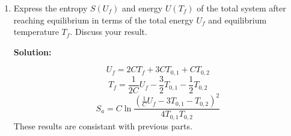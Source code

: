 \documentclass[10pt]{article}
\newenvironment{Solution}
    {\textbf{Solution:}
    
    \vspace{5mm}
    \begin{tcolorbox}
    }
    {
    \end{tcolorbox}
    \vspace{5mm}
    }
\begin{document}
\begin{enumerate}
\begin{enumerate}
\item Express the entropy $S\left(U_{f}\right)$ and energy $U\left(T_{f}\right)$ of the total system after reaching equilibrium in terms of the total energy $U_{f}$ and equilibrium temperature $T_{f} .$ Discuss your result.

\begin{Solution}
\begin{equation}
    U_f = 2C T_f + 3C T_{0,1} + C T_{0,2}
\end{equation}
\begin{equation}
    T_f = \frac{1}{2C}U_f - \frac{3}{2} T_{0,1} - \frac{1}{2} T_{0,2}
\end{equation}
\begin{equation}
    S_a = C \ln{\frac{\left(\frac{1}{C}U_f - 3 T_{0,1} -  T_{0,2}\right)^2}{4T_{0,1}T_{0,2}}}
\end{equation}
These results are consistant with previous parts.
\end{Solution}
    
\end{enumerate}
\end{enumerate}
\end{document}
